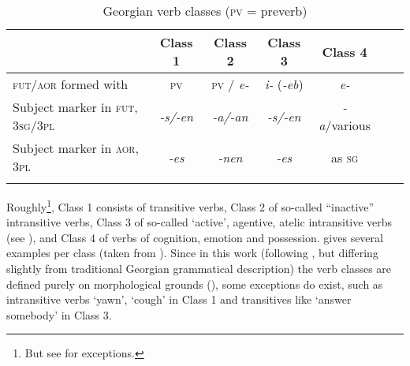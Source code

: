 \begin{table}
	\begin{tabular}{lcccccc}
    \lsptoprule
		
		& Class 1 & Class 2 & Class 3 & Class 4 \\
		\midrule
		\textsc{fut/aor} formed with & \textsc{pv} & \textsc{pv} / \textit{e-} & \textit{i-} (\textit{-eb}) &  \textit{e-} \\
		
		Subject marker in \textsc{fut}, \textsc{3sg/3pl} & \textit{-s/-en} & \textit{-a/-an} & \textit{-s/-en} & \textit{-a}/various \\
		
		Subject marker in \textsc{aor}, \textsc{3pl} & \textit{-es} & \textit{-nen} & \textit{-es} & as \textsc{sg} \\
		\lspbottomrule
	\end{tabular}
	\caption{Georgian verb classes (\textsc{pv} = preverb)}
	\label{verbderiv-table-georgianverbclasses}
\end{table}

Roughly\footnote{But see \textcites[]{harris1981syntax} for exceptions.}, Class 1 consists of transitive verbs, Class 2 of so-called “inactive” intransitive verbs, Class 3 of so-called `active', agentive, atelic intransitive verbs (see \cites[]{holisky1981medial}), and Class 4 of verbs of cognition, emotion and possession.  gives several examples per class (taken from \cites[261--267]{harris1981syntax}). Since in this work (following \cites[]{harris1981syntax}, but differing slightly from traditional Georgian grammatical description) the verb classes are defined purely on morphological grounds (), some exceptions do exist, such as intransitive verbs `yawn',  `cough' in Class 1 and transitives like `answer somebody' in Class 3.

